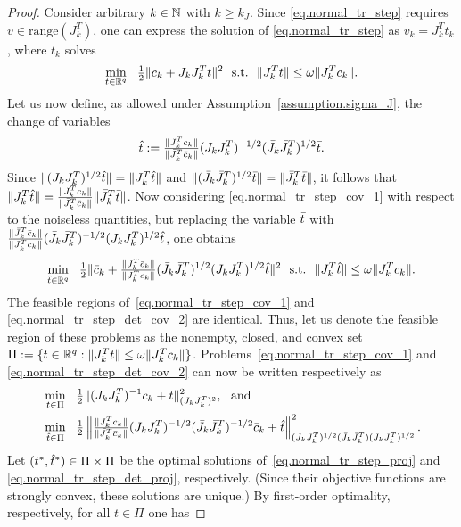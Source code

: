 \begin{proof}
  Consider arbitrary $k \in \mathbb{N}$ with $k \geq k_J$.  Since \eqref{eq.normal_tr_step} requires $v \in \mathrm{range}(J_k^T)$, one can express the solution of \eqref{eq.normal_tr_step} as $v_k = J_k^Tt_k$, where $t_k$ solves
  \begin{equation}\label{eq.normal_tr_step_cov_1}
    \min_{t \in \RR^q}\ \ \tfrac{1}{2} \| c_k + J_k J_k^T t  \|^2\ \ \st\ \ \|J_k^T t \| \leq \omega \|J_k^T c_k\|.
  \end{equation}
  Let us now define, as allowed under Assumption~\ref{assumption.sigma_J}, the change of variables
  \begin{equation}\label{eq.tbar_that}
   {\hat t} := {\tfrac{\|J_k^Tc_k\|}{\|{\bar J}_k^T{\bar c}_k\|}} (J_k J_k^T)^{-1/2} ({\bar J}_k {\bar J}_k^T)^{1/2} {\bar t}.
  \end{equation}
  Since $\|(J_k J_k^T)^{1/2} {\hat t}\| = \|J_k^T {\hat t}\|$ and $\|({\bar J}_k {\bar J}_k^T)^{1/2} {\bar t}\| = \|{\bar J}_k^T {\bar t}\|$, it follows that $\|J_k^T {\hat t}\| = {\tfrac{\|J_k^Tc_k\|}{\|{\bar J}_k^T{\bar c}_k\|}} \| {\bar J}_k^T {\bar t}\|$.  Now considering \eqref{eq.normal_tr_step_cov_1} with respect to the noiseless quantities, but replacing the variable ${\bar t}$ with $\tfrac{\|{\bar J}_k^T {\bar c}_k\|}{\|J_k^T c_k\|}  ({\bar J}_k {\bar J}_k^T)^{-1/2} (J_k J_k^T)^{1/2} {\hat t}$, one obtains
  \begin{equation}\label{eq.normal_tr_step_det_cov_2}
    \min_{{\hat t} \in \mathbb{R}^q}\ \ \tfrac{1}{2} \| {\bar c}_k + \tfrac{\|{\bar J}_k^T {\bar c}_k\|}{\|J_k^T c_k\|} ({\bar J}_k {\bar J}_k^T)^{1/2} (J_k J_k^T)^{1/2} {\hat t} \|^2\ \ \text{s.t.}\ \ \|J_k^T {\hat t} \| \leq \omega \|J_k^T c_k\|.
  \end{equation}
  The feasible regions of~\eqref{eq.normal_tr_step_cov_1} and \eqref{eq.normal_tr_step_det_cov_2} are identical.  Thus, let us denote the feasible region of these problems as the nonempty, closed, and convex set $\Pi := \{t \in \mathbb{R}^q: \|J_k^T t\| \leq \omega \|J_k^T c_k\|\}$.  Problems~\eqref{eq.normal_tr_step_cov_1} and \eqref{eq.normal_tr_step_det_cov_2} can now be written respectively as 
  \begin{align}
    &\min_{t \in \Pi}\ \ \tfrac{1}{2} \| (J_k J_k^T)^{-1} c_k +  t  \|_{(J_k J_k^T)^2}^2, \label{eq.normal_tr_step_proj} \ \ \text{and} \\
    &\min_{\that \in \Pi}\ \ \tfrac{1}{2} \left\| \JCfrac (J_k J_k^T)^{-1/2} (\Jtrue_k \Jtrue_k^T)^{-1/2} \ctrue_k +   \that   \right\|_{(J_k J_k^T)^{1/2} (\Jtrue_k \Jtrue_k^T) (J_k J_k^T)^{1/2}}^2. \label{eq.normal_tr_step_det_proj}
  \end{align}
  Let $(t^*, {\hat t}^*) \in \Pi \times \Pi$ be the optimal solutions of~\eqref{eq.normal_tr_step_proj} and \eqref{eq.normal_tr_step_det_proj}, respectively.  (Since their objective functions are strongly convex, these solutions are unique.)  By first-order optimality, respectively, for all $t \in \Pi$ one has

\end{proof}
